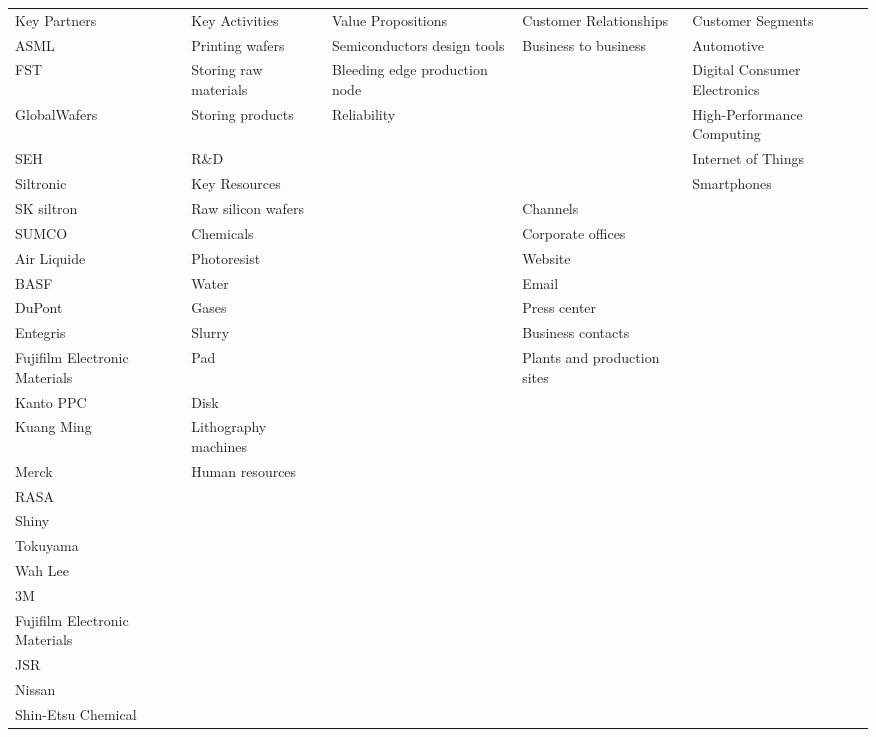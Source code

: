 \begin{table}[h]
\begin{adjustbox}{max width=\textwidth}
\begin{tabular}{lllll}
\rowcolor[HTML]{FFCCC9} 
\cellcolor[HTML]{FFCCC9}Key Partners & Key Activities & \cellcolor[HTML]{FFCCC9}Value Propositions & Customer Relationships & Customer Segments \\
ASML &
  Printing wafers &
  Semiconductors design tools &
  Business to business &
  Automotive \\
FST &
  Storing raw materials &
  Bleeding edge production node &
   &
  Digital Consumer Electronics \\
GlobalWafers &
  Storing products &
  Reliability &
   &
  High-Performance Computing \\
SEH &
  R\&D &
   &
   &
  Internet of Things \\
Siltronic &
  \cellcolor[HTML]{FFCCC9}Key Resources &
   &
   &
  Smartphones \\
SK siltron &
  Raw silicon wafers &
   &
  \cellcolor[HTML]{FFCCC9}Channels &
   \\
SUMCO &
  Chemicals &
   &
  Corporate offices &
   \\
Air Liquide &
  Photoresist &
    &
   Website &
   \\
BASF &
  Water &
     &
   Email &
   \\
DuPont &
  Gases &
    &
   Press center &
   \\
Entegris &
  Slurry &
    &
   Business contacts &
   \\
Fujifilm Electronic Materials &
  Pad &
   &
   Plants and production sites &
   \\
Kanto PPC &
  Disk &
   &
   &
   \\
Kuang Ming &
  Lithography machines &
   &
   &
   \\
Merck &
  Human resources &
   &
   &
   \\
RASA &
   &
   &
   &
   \\
Shiny &
   &
   &
   &
   \\
Tokuyama &
   &
   &
   &
   \\
Wah Lee &
   &
   &
   &
   \\
3M &
   &
   &
   &
   \\
Fujifilm Electronic Materials &
   &
   &
   &
   \\
JSR &
   &
   &
   &
   \\
Nissan &
   &
   &
   &
   \\
Shin-Etsu Chemical &
   &
   &

\end{tabular}
\end{adjustbox}
\end{table}
